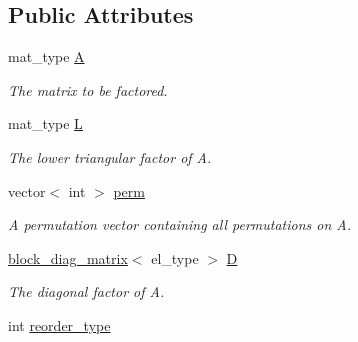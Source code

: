 \subsection*{Public Attributes}
\begin{DoxyCompactItemize}
\item 
mat\+\_\+type \hyperlink{classsymildl_1_1solver_ac65e7e1085c28bdb177819c87d050ea5}{A}\hypertarget{classsymildl_1_1solver_ac65e7e1085c28bdb177819c87d050ea5}{}\label{classsymildl_1_1solver_ac65e7e1085c28bdb177819c87d050ea5}

\begin{DoxyCompactList}\small\item\em The matrix to be factored. \end{DoxyCompactList}\item 
mat\+\_\+type \hyperlink{classsymildl_1_1solver_ab32994407d26e29c46f6c04f757523c2}{L}\hypertarget{classsymildl_1_1solver_ab32994407d26e29c46f6c04f757523c2}{}\label{classsymildl_1_1solver_ab32994407d26e29c46f6c04f757523c2}

\begin{DoxyCompactList}\small\item\em The lower triangular factor of A. \end{DoxyCompactList}\item 
vector$<$ int $>$ \hyperlink{classsymildl_1_1solver_aa98f03a6a70a130e6aaa4bb04938b666}{perm}\hypertarget{classsymildl_1_1solver_aa98f03a6a70a130e6aaa4bb04938b666}{}\label{classsymildl_1_1solver_aa98f03a6a70a130e6aaa4bb04938b666}

\begin{DoxyCompactList}\small\item\em A permutation vector containing all permutations on A. \end{DoxyCompactList}\item 
\hyperlink{classblock__diag__matrix}{block\+\_\+diag\+\_\+matrix}$<$ el\+\_\+type $>$ \hyperlink{classsymildl_1_1solver_a9ab0b12d9be123fe075c1b43d69a0596}{D}\hypertarget{classsymildl_1_1solver_a9ab0b12d9be123fe075c1b43d69a0596}{}\label{classsymildl_1_1solver_a9ab0b12d9be123fe075c1b43d69a0596}

\begin{DoxyCompactList}\small\item\em The diagonal factor of A. \end{DoxyCompactList}\item 
int \hyperlink{classsymildl_1_1solver_a7b25ae1d5051ffdcf7901076221d6cd3}{reorder\+\_\+type}\hypertarget{classsymildl_1_1solver_a7b25ae1d5051ffdcf7901076221d6cd3}{}\label{classsymildl_1_1solver_a7b25ae1d5051ffdcf7901076221d6cd3}


\end{DoxyCompactItemize}
